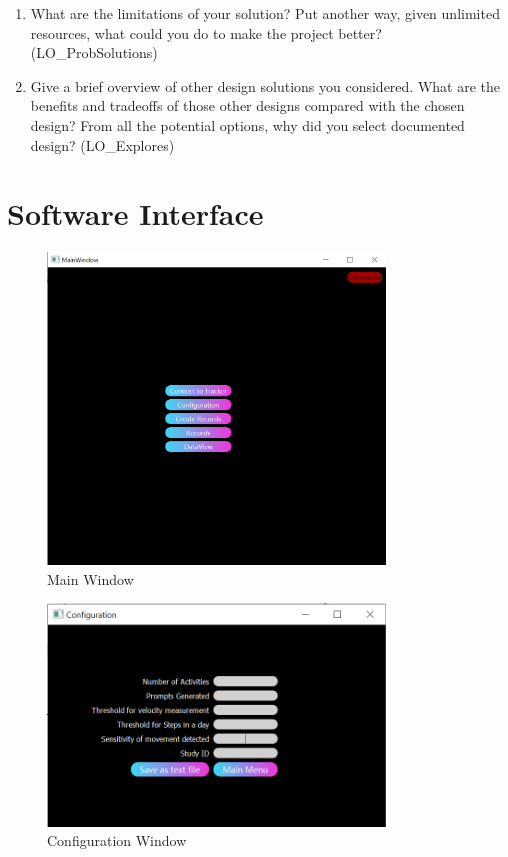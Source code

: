 \documentclass[12pt, titlepage]{article}
\begin{document}
\begin{enumerate}
  \item What are the limitations of your solution?  Put another way, given
  unlimited resources, what could you do to make the project better? (LO\_ProbSolutions)
  \item Give a brief overview of other design solutions you considered.  What
  are the benefits and tradeoffs of those other designs compared with the chosen
  design?  From all the potential options, why did you select documented design?
  (LO\_Explores)
\end{enumerate}

\section{Software Interface}
\begin{figure}[h!]
	\begin{center}
		 \includegraphics[width=0.8\textwidth]{MainWindow}
		\caption{Main Window}
		\label{MainWindow} 
	\end{center}
\end{figure}

\begin{figure}[h!]
	\begin{center}
		 \includegraphics[width=0.8\textwidth]{Config}
		\caption{Configuration Window}
		\label{Config} 
	\end{center}
\end{figure}
\end{document}
